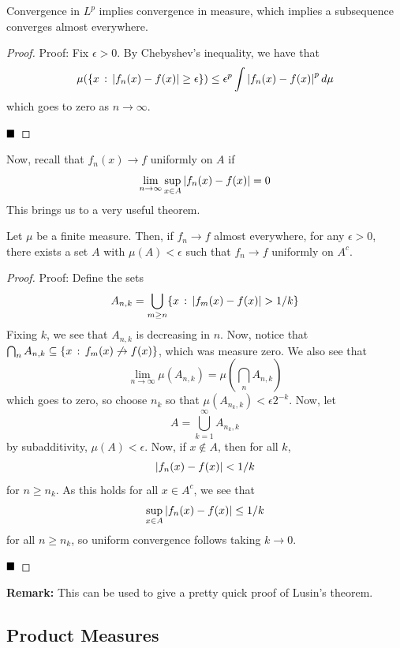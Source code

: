 \begin{lemma}
    Convergence in $L^{p}$ implies convergence in measure, which implies a subsequence converges almost everywhere. 
\end{lemma}
\begin{proof}{Proof:}
    Fix $\epsilon > 0$. By Chebyshev's inequality, we have that
    \[ \mu(\{x \, :\, \left\lvert {f_{n}(x) - f(x)} \right\rvert \geq \epsilon\}) \leq \epsilon^{p} \int \left\lvert {f_n(x) - f(x)} \right\rvert^{p} d\mu \]
    which goes to zero as $n \to \infty$. 

    $\qed$
\end{proof}

Now, recall that $f_{n}(x) \to f$ uniformly on $A$ if
\[ \lim_{n \to \infty} \sup_{x \in A} \left\lvert {f_{n}(x) - f(x)} \right\rvert = 0 \]
This brings us to a very useful theorem.

\begin{theorem}
    Let $\mu$ be a finite measure. Then, if $f_n \to f$ almost everywhere, for any $\epsilon > 0$, there exists a set $A$ with $\mu(A) < \epsilon$ such that $f_n \to f$ uniformly on $A^{c}$.
\end{theorem}
\begin{proof}{Proof:}
    Define the sets
    \[ A_{n, k} = \bigcup_{m \geq n} \{x \, :\, \left\lvert {f_m(x) - f(x)} \right\rvert > 1/k\} \]
    Fixing $k$, we see that $A_{n, k}$ is decreasing in $n$. Now, notice that $\bigcap_{n} A_{n, k} \subseteq \{x \, :\, f_m(x) \not \to f(x)\}$, which was measure zero. We also see that
    \[ \lim_{n \to \infty} \mu(A_{n, k}) = \mu\left(\bigcap_{n} A_{n, k}\right) \]
    which goes to zero, so choose $n_{k}$ so that $\mu(A_{n_{k}, k}) < \epsilon 2^{-k}$. Now, let
    \[ A = \bigcup_{k = 1}^{\infty} A_{n_{k}, k} \]
    by subadditivity, $\mu(A) < \epsilon$. Now, if $x \notin A$, then for all $k$, 
    \[ \left\lvert {f_{n}(x) - f(x)} \right\rvert < 1/k \]
    for $n \geq n_{k}$. As this holds for all $x \in A^{c}$, we see that
    \[ \sup_{x \in A} \left\lvert {f_{n}(x) - f(x)} \right\rvert \leq 1/k \]
    for all $n \geq n_{k}$, so uniform convergence follows taking $k \to 0$.

    $\qed$
\end{proof}

\textbf{Remark:} This can be used to give a pretty quick proof of Lusin's theorem. 

\subsection*{Product Measures}
\sectionspace

